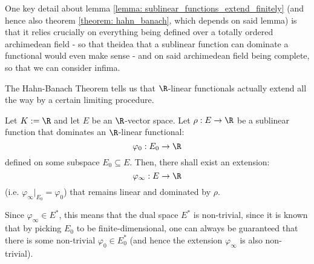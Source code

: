         \begin{remark}
            One key detail about lemma \ref{lemma: sublinear_functions_extend_finitely} (and hence also theorem \ref{theorem: hahn_banach}, which depends on said lemma) is that it relies crucially on everything being defined over a totally ordered archimedean field - so that theidea that a sublinear function can dominate a functional would even make sense - and on said archimedean field being complete, so that we can consider infima. 
        \end{remark}
        The Hahn-Banach Theorem tells us that $\R$-linear functionals actually extend all the way by a certain limiting procedure. 
        \begin{theorem} \label{theorem: hahn_banach}
            Let $K := \R$ and let $E$ be an $\R$-vector space. Let $\rho: E \to \R$ be a sublinear function that dominates an $\R$-linear functional:
                $$\varphi_0: E_0 \to \R$$
            defined on some subspace $E_0 \subseteq E$. Then, there shall exist an extension:
                $$\varphi_{\infty}: E \to \R$$
            (i.e. $\varphi_{\infty}|_{E_0} = \varphi_0$) that remains linear and dominated by $\rho$.

            Since $\varphi_{\infty} \in E^*$, this means that the dual space $E^*$ is non-trivial, since it is known that by picking $E_0$ to be finite-dimensional, one can always be guaranteed that there is some non-trivial $\varphi_0 \in E_0^*$ (and hence the extension $\varphi_{\infty}$ is also non-trivial).
        \end{theorem}

